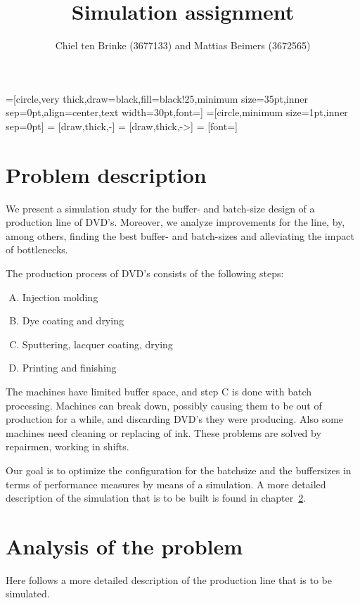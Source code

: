 \documentclass{report}
\title{Simulation assignment}
\author{Chiel ten Brinke (3677133) and Mattias Beimers (3672565)}
\date{\vspace{-3ex}}
\begin{document}
=[circle,very thick,draw=black,fill=black!25,minimum size=35pt,inner sep=0pt,align=center,text width=30pt,font=\scriptsize]
=[circle,minimum size=1pt,inner sep=0pt]
 = [draw,thick,-]
 = [draw,thick,->]
 = [font=\scriptsize]

\maketitle
\tableofcontents


\chapter{Problem description}
We present a simulation study for the buffer- and batch-size design of a production line of DVD's.
Moreover, we analyze improvements for the line, by, among others, finding the best buffer- and batch-sizes and alleviating the impact of bottlenecks.

The production process of DVD's consists of the following steps:
\begin{enumerate}[A.]
    \item Injection molding
    \item Dye coating and drying
    \item Sputtering, lacquer coating, drying
    \item Printing and finishing
\end{enumerate}
The machines have limited buffer space, and step C is done with batch processing.
Machines can break down, possibly causing them to be out of production for a while,
and discarding DVD's they were producing. Also some machines need cleaning or replacing of ink.
These problems are solved by repairmen, working in shifts.

Our goal is to optimize the configuration for the batchsize and the buffersizes in terms of performance measures by means of a simulation.
A more detailed description of the simulation that is to be built is found in chapter~\ref{problem_analysis}.

\chapter{Analysis of the problem}
\label{problem_analysis}
Here follows a more detailed description of the production line that is to be simulated.
\end{document}
